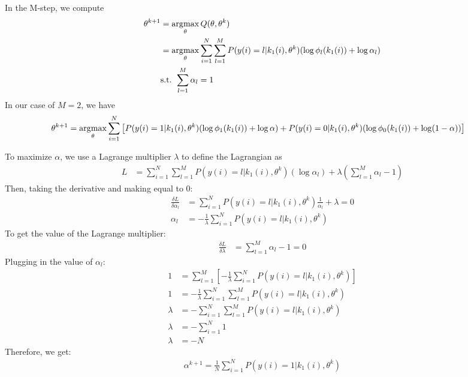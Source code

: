 In the M-step, we compute
\begin{align*}
\theta^{k+1} &= \operatorname*{\arg\!\max}_\theta Q(\theta, \theta^{k}) \\
&= \operatorname*{\arg\!\max}_\theta \sum_{i=1}^{N} \sum_{l=1}^{M} P(y(i) = l | k_1(i), \theta^{k}) (\log \phi_l(k_1(i)) + \log \alpha_l) \\
& \text{s.t. } \sum_{l=1}^{M} \alpha_l = 1
\end{align*}
In our case of $M=2$, we have
\begin{align*}
\theta^{k+1} &= \operatorname*{\arg\!\max}_\theta \sum_{i=1}^{N} \left[ P(y(i) = 1 | k_1(i), \theta^{k}) (\log \phi_1(k_1(i)) + \log \alpha) + P(y(i) = 0 | k_1(i), \theta^{k}) (\log \phi_0(k_1(i)) + \log (1-\alpha)) \right]
\end{align*}

To maximize $\alpha$, we use a Lagrange multiplier $\lambda$ to define the Lagrangian as
\begin{align*}
L &= \sum_{i=1}^{N} \sum_{l=1}^{M} P(y(i) = l | k_1(i), \theta^{k}) (\log \alpha_l) + \lambda \left( \sum_{l=1}^{M} \alpha_l - 1 \right)
\end{align*}
Then, taking the derivative and making equal to 0:
\begin{align*}
\frac{\delta L}{\delta \alpha_l} &= \sum_{i=1}^{N} P(y(i) = l | k_1(i), \theta^{k})  \frac{1}{\alpha_l} + \lambda = 0 \\
\alpha_l &= -\frac{1}{\lambda} \sum_{i=1}^{N} P(y(i) = l | k_1(i), \theta^{k}) 
\end{align*}
To get the value of the Lagrange multiplier:
\begin{align*}
\frac{\delta L}{\delta \lambda} &= \sum_{l=1}^{M} \alpha_l - 1 = 0 
\end{align*}
Plugging in the value of $\alpha_l$:
\begin{align*}
1 &= \sum_{l=1}^{M} \left[ -\frac{1}{\lambda} \sum_{i=1}^{N} P(y(i) = l | k_1(i), \theta^{k}) \right] \\
1 &=  -\frac{1}{\lambda} \sum_{i=1}^{N} \sum_{l=1}^{M} P(y(i) = l | k_1(i), \theta^{k})\\
\lambda  &= - \sum_{i=1}^{N} \sum_{l=1}^{M} P(y(i) = l | k_1(i), \theta^{k})\\
\lambda  &= - \sum_{i=1}^{N} 1\\
\lambda &= -N
\end{align*}
Therefore, we get:
\begin{align*}
\alpha^{k+1} = \frac{1}{N} \sum_{i=1}^{N} P(y(i) = 1 | k_1(i), \theta^{k})
\end{align*}

